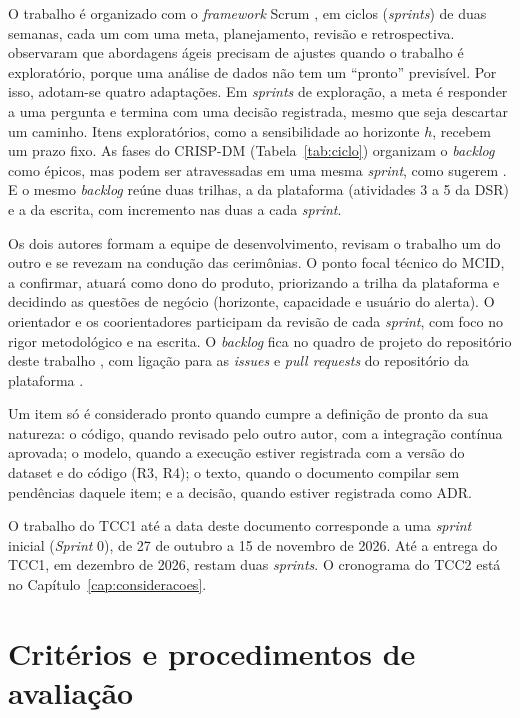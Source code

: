 O trabalho é organizado com o \textit{framework} Scrum \cite{schwaber2020scrum}, em ciclos (\textit{sprints}) de duas semanas, cada um com uma meta, planejamento, revisão e retrospectiva.  observaram que abordagens ágeis precisam de ajustes quando o trabalho é exploratório, porque uma análise de dados não tem um ``pronto'' previsível. Por isso, adotam-se quatro adaptações. Em \textit{sprints} de exploração, a meta é responder a uma pergunta e termina com uma decisão registrada, mesmo que seja descartar um caminho. Itens exploratórios, como a sensibilidade ao horizonte $h$, recebem um prazo fixo. As fases do CRISP-DM (Tabela~\ref{tab:ciclo}) organizam o \textit{backlog} como épicos, mas podem ser atravessadas em uma mesma \textit{sprint}, como sugerem . E o mesmo \textit{backlog} reúne duas trilhas, a da plataforma (atividades 3 a 5 da DSR) e a da escrita, com incremento nas duas a cada \textit{sprint}.

Os dois autores formam a equipe de desenvolvimento, revisam o trabalho um do outro e se revezam na condução das cerimônias. O ponto focal técnico do MCID, a confirmar, atuará como dono do produto, priorizando a trilha da plataforma e decidindo as questões de negócio (horizonte, capacidade e usuário do alerta). O orientador e os coorientadores participam da revisão de cada \textit{sprint}, com foco no rigor metodológico e na escrita. O \textit{backlog} fica no quadro de projeto do repositório deste trabalho \cite{repositoriotcc}, com ligação para as \textit{issues} e \textit{pull requests} do repositório da plataforma \cite{govhubcidades}.

Um item só é considerado pronto quando cumpre a definição de pronto da sua natureza: o código, quando revisado pelo outro autor, com a integração contínua aprovada; o modelo, quando a execução estiver registrada com a versão do dataset e do código (R3, R4); o texto, quando o documento compilar sem pendências daquele item; e a decisão, quando estiver registrada como ADR.

O trabalho do TCC1 até a data deste documento corresponde a uma \textit{sprint} inicial (\textit{Sprint} 0), de 27 de outubro a 15 de novembro de 2026. Até a entrega do TCC1, em dezembro de 2026, restam duas \textit{sprints}. O cronograma do TCC2 está no Capítulo~\ref{cap:consideracoes}.

\section{Critérios e procedimentos de avaliação}
\label{sec:avaliacao}

